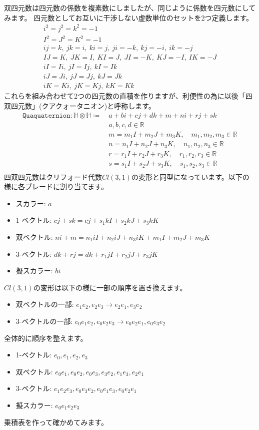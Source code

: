 \documentclass[a4paper,12pt,notitlepage]{jsreport}
\begin{document}
双四元数は四元数の係数を複素数にしましたが、同じように係数を四元数にしてみます。
四元数としてお互いに干渉しない虚数単位のセットを2つ定義します。
\begin{gather}
  i^2=j^2=k^2=-1\\
  I^2=J^2=K^2=-1\\
  ij=k,~jk=i,~ki=j,~ji=-k,~kj=-i,~ik=-j\\
  IJ=K,~JK=I,~KI=J,~JI=-K,~KJ=-I,~IK=-J\\
  iI=Ii,~jI=Ij,~kI=Ik\\
  iJ=Ji,~jJ=Jj,~kJ=Jk\\
  iK=Ki,~jK=Kj,~kK=Kk
\end{gather}
これらを組み合わせて2つの四元数の直積を作りますが、利便性の為に以後「四双四元数」(クアクォータニオン)と呼称します。
\begin{equation}
  \begin{split}
    \texttt{Quaquaternion}:\mathbb{H}\otimes\mathbb{H}\coloneq ~&a+bi+cj+dk+m+ni+rj+sk\\
    &a,b,c,d\in\mathbb{R}\\
    &m=m_1I+m_2J+m_3K,\quad m_1,m_2,m_3\in\mathbb{R}\\
    &n=n_1I+n_2J+n_3K,\quad n_1,n_2,n_3\in\mathbb{R}\\
    &r=r_1I+r_2J+r_3K,\quad r_1,r_2,r_3\in\mathbb{R}\\
    &s=s_1I+s_2J+s_3K,\quad s_1,s_2,s_3\in\mathbb{R}\\
  \end{split}
\end{equation}
四双四元数はクリフォード代数$ Cl(3,1) $の変形と同型になっています。以下の様に各ブレードに割り当てます。
\begin{itemize}
  \item スカラー: $ a $
  \item 1-ベクトル: $ c j + s k = c j + s_1 kI + s_2 kJ + s_3 kK $
  \item 双ベクトル: $ n i + m = n_1 iI + n_2 iJ + n_3 iK + m_1 I + m_2 J + m_3 K $
  \item 3-ベクトル: $ dk + rj = dk + r_1 jI+r_2 jJ+r_3 jK $
  \item 擬スカラー: $ bi $
\end{itemize}
$ Cl(3,1) $の変形は以下の様に一部の順序を置き換えます。
\begin{itemize}
  \item 双ベクトルの一部: $ e_1 e_2 , e_2 e_3 \rightarrow e_2 e_1 , e_3 e_2 $
  \item 3-ベクトルの一部: $ e_0 e_1 e_2 , e_0 e_2 e_3 \rightarrow e_0 e_2 e_1 , e_0 e_3 e_2 $
\end{itemize}
全体的に順序を整えます。
\begin{itemize}
  \item 1-ベクトル: $ e_0 , e_1 , e_2 , e_3 $
  \item 双ベクトル: $ e_0e_1 , e_0e_2 , e_0e_3 , e_3e_2 , e_1e_3 , e_2e_1 $
  \item 3-ベクトル: $ e_1e_2e_3 , e_0e_3e_2 , e_0e_1e_3 , e_0e_2e_1 $
  \item 擬スカラー: $ e_0e_1e_2e_3 $
\end{itemize}
乗積表を作って確かめてみます。
\end{document}
